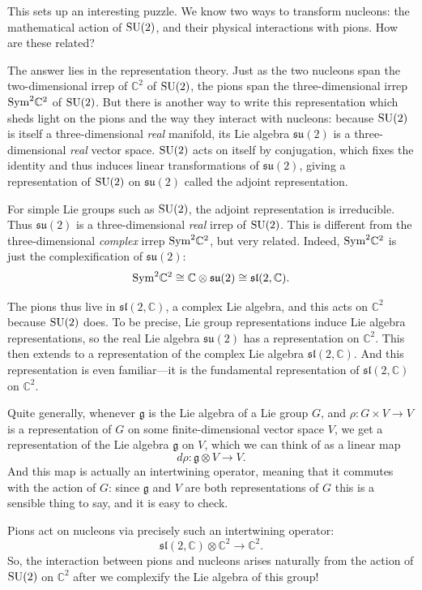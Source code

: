 \documentclass[12pt]{article}
\newcommand{\maps}{\colon}    %
\newcommand{\C}{{\mathbb C}}  %
\newcommand{\SU}{{\rm SU}}    %
\renewcommand{\sl}{\mathfrak{sl}} %
\newcommand{\su}{{\mathfrak{su}}}  %
\newcommand{\Sym}{{\rm Sym}} %
\newcommand{\iso}{\cong} %
\begin{document}
This sets up an interesting puzzle.   We know two ways to transform 
nucleons: the mathematical action of $\SU(2)$, and their physical 
interactions with pions. How are these related?

The answer lies in the representation theory. Just as the two nucleons
span the two-dimensional irrep of $\C^2$ of $\SU(2)$, the pions 
span the three-dimensional irrep $\Sym^2 \C^2$ of $\SU(2)$. But there
is another way to write this representation which sheds light on the
pions and the way they interact with nucleons: because $\SU(2)$ is
itself a three-dimensional \emph{real} manifold, its Lie algebra
$\su(2)$ is a three-dimensional \emph{real}
vector space. $\SU(2)$ acts on itself by conjugation, which fixes the
identity and thus induces linear transformations of $\su(2)$, giving a
representation of $\SU(2)$ on $\su(2)$ called the adjoint
representation.

For simple Lie groups such as $\SU(2)$, the adjoint representation is
irreducible.  Thus $\su(2)$ is a three-dimensional \emph{real} irrep
of $\SU(2)$.  This is different from the three-dimensional \emph{complex} 
irrep $\Sym^2 \C^2$, but very related. Indeed, $\Sym^2 \C^2$ is just the
complexification of $\su(2)$:
\[ \Sym^2 \C^2 \iso \C \otimes \su(2) \iso \sl(2,\C) . \]

The pions thus live in $\sl(2,\C)$, a complex Lie algebra, and
this acts on $\C^2$ because $\SU(2)$ does. To be precise, Lie group
representations induce Lie algebra representations, so the real Lie algebra
$\su(2)$ has a representation on $\C^2$.  This then extends
to a representation of the complex Lie algebra $\sl(2,\C)$. 
And this representation is even familiar---it is the fundamental 
representation of $\sl(2,\C)$ on $\C^2$.

Quite generally, whenever $\mathfrak{g}$ is the Lie algebra of a 
Lie group $G$, and $\rho \maps G \times V \to V$ is a representation of
$G$ on some finite-dimensional vector space $V$, we get
a representation of the Lie algebra $\mathfrak{g}$ on $V$, which
we can think of as a linear map
\[ d\rho \maps \mathfrak{g} \otimes V \to V .\]
And this map is actually an intertwining operator,
meaning that it commutes with the action of $G$: since $\mathfrak{g}$ 
and $V$ are both representations of $G$ this is a sensible thing to 
say, and it is easy to check.

Pions act on nucleons via precisely such an intertwining operator:
\[ \sl(2, \C) \otimes \C^2 \to \C^2 . \]
So, the interaction between pions and nucleons arises naturally from 
the action of $\SU(2)$ on $\C^2$ after we complexify the Lie algebra of 
this group!  
\end{document}
